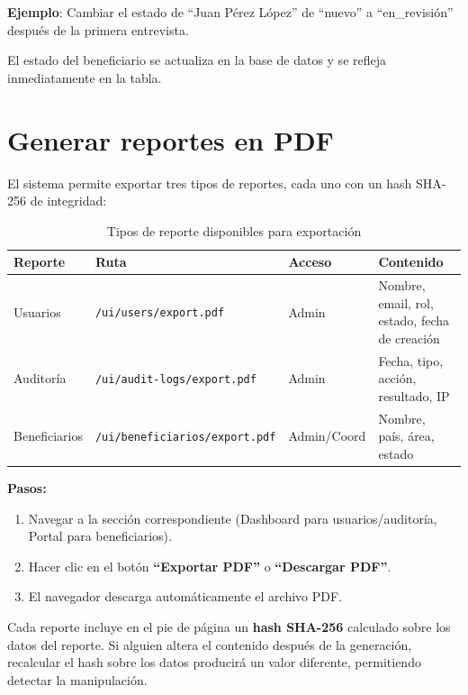 \documentclass[10pt,letterpaper]{report}
\begin{document}
\textbf{Ejemplo}: Cambiar el estado de ``Juan Pérez López'' de ``nuevo'' a ``en\_revisión'' después de la primera entrevista.

\begin{successbox}
  El estado del beneficiario se actualiza en la base de datos y se refleja inmediatamente en la tabla.
\end{successbox}

\section{Generar reportes en PDF}

El sistema permite exportar tres tipos de reportes, cada uno con un hash SHA-256 de integridad:

\begin{table}[H]
  \centering
  \caption{Tipos de reporte disponibles para exportación}
  \label{tab:reportes}
  \begin{tabularx}{\textwidth}{l l l X}
    \toprule
    \textbf{Reporte} & \textbf{Ruta} & \textbf{Acceso} & \textbf{Contenido} \\
    \midrule
    Usuarios & \texttt{/ui/users/export.pdf} & Admin & Nombre, email, rol, estado, fecha de creación \\
    Auditoría & \texttt{/ui/audit-logs/export.pdf} & Admin & Fecha, tipo, acción, resultado, IP \\
    Beneficiarios & \texttt{/ui/beneficiarios/export.pdf} & Admin/Coord & Nombre, país, área, estado \\
    \bottomrule
  \end{tabularx}
\end{table}

\textbf{Pasos:}
\begin{enumerate}[leftmargin=2cm]
  \item Navegar a la sección correspondiente (Dashboard para usuarios/auditoría, Portal para beneficiarios).
  \item Hacer clic en el botón \textbf{``Exportar PDF''} o \textbf{``Descargar PDF''}.
  \item El navegador descarga automáticamente el archivo PDF.
\end{enumerate}

\begin{infobox}
  Cada reporte incluye en el pie de página un \textbf{hash SHA-256} calculado sobre los datos del reporte. Si alguien altera el contenido después de la generación, recalcular el hash sobre los datos producirá un valor diferente, permitiendo detectar la manipulación.
\end{infobox}
\end{document}
